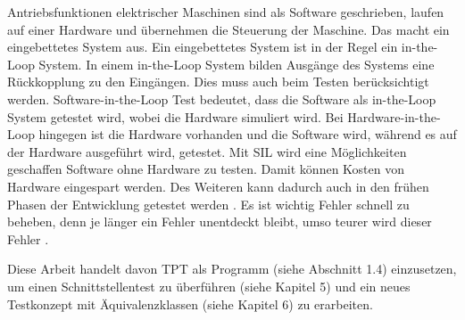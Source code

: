 Antriebsfunktionen elektrischer Maschinen sind als Software geschrieben, laufen auf einer 
Hardware und übernehmen die Steuerung der Maschine. Das macht ein eingebettetes System aus.
Ein eingebettetes System ist in der Regel ein in-the-Loop System. In einem in-the-Loop System bilden Ausgänge des Systems
eine Rückkopplung zu den Eingängen. Dies muss auch beim Testen berücksichtigt werden.
Software-in-the-Loop Test bedeutet, dass die Software als in-the-Loop System getestet wird, wobei die Hardware
simuliert wird. Bei Hardware-in-the-Loop hingegen ist die Hardware vorhanden und die Software wird, während
es auf der Hardware ausgeführt wird, getestet.
Mit SIL wird eine Möglichkeiten geschaffen Software ohne Hardware zu testen. Damit können Kosten von Hardware eingespart werden.
Des Weiteren kann dadurch auch in den frühen Phasen der Entwicklung getestet werden \parencite[S. 1 f.]{silest}\parencite[]{hilwikipedia}. Es ist wichtig Fehler schnell zu beheben,
denn je länger ein Fehler unentdeckt bleibt, umso teurer wird dieser Fehler \parencite[]{fehler}.

Diese Arbeit handelt davon TPT als Programm (siehe Abschnitt 1.4) einzusetzen, um einen Schnittstellentest zu überführen (siehe Kapitel 5) und ein
neues Testkonzept mit Äquivalenzklassen (siehe Kapitel 6) zu erarbeiten.






